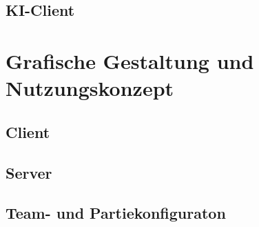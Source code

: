 \documentclass[a4paper,12pt,
headsepline,           %
oneside,               %
pointlessnumbers,      %
bibtotoc,              %
]{scrartcl}
\begin{document}
    \subsection{KI-Client}
    
    
	\section{Grafische Gestaltung und Nutzungskonzept}
    \subsection{Client}
    	
    \subsection{Server}
    	
    \subsection{Team- und Partiekonfiguraton}
    	
\end{document}
